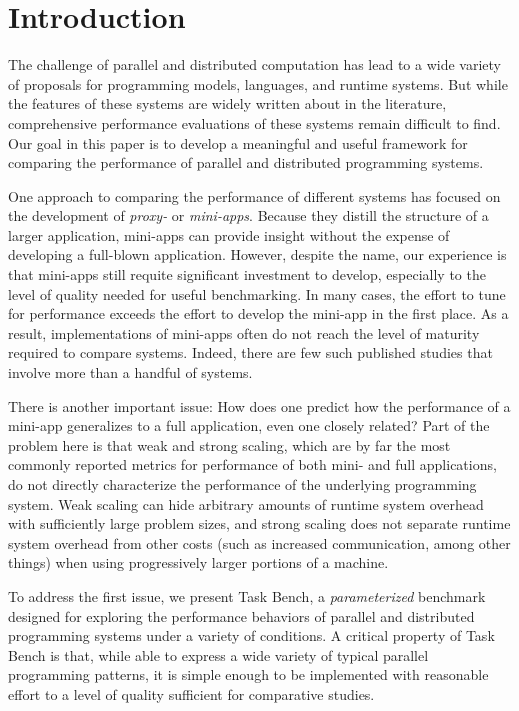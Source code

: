 \section{Introduction}
\label{sec:introduction}

The challenge of parallel and distributed computation has lead to a
wide variety of proposals for programming models, languages, and
runtime systems. But while the features of these systems are widely
written about in the literature, comprehensive performance evaluations
of these systems remain difficult to find. Our
goal in this paper is to develop a meaningful and useful framework for
comparing the performance of parallel and distributed programming
systems.



One approach to comparing the performance of different systems has
focused on the development of \emph{proxy-} or
\emph{mini-apps}. Because they distill the structure of a larger
application, mini-apps can provide insight
without the expense of developing a full-blown
application. However, despite the name, our experience is that
mini-apps still requite significant investment to develop, especially
to the level of quality needed for useful benchmarking. In many cases,
the effort to tune for performance exceeds the effort to develop the
mini-app in the first place. As a result, implementations of mini-apps
often do not reach the level of maturity required to compare
systems. Indeed, there are few such published studies that involve
more than a handful of systems.

There is another important issue: How does one predict how
the performance of a mini-app generalizes to a full
application, even one closely related? Part of the problem here is
that weak and strong scaling, which are by far the most commonly
reported metrics for performance of both mini- and full applications,
do not directly characterize the performance of the underlying
programming system. Weak scaling can hide arbitrary amounts of runtime
system overhead with sufficiently large problem sizes, and strong
scaling does not separate runtime system overhead from other costs
(such as increased communication, among other things) when
using progressively larger portions of a machine.

To address the first issue, we present Task Bench, a
\emph{parameterized} benchmark designed for exploring the performance
behaviors of parallel and distributed programming systems under a
variety of conditions. A critical property of Task Bench is that,
while able to express a wide variety of typical parallel programming
patterns, it is simple enough to be implemented with reasonable effort
to a level of quality sufficient for comparative studies.

